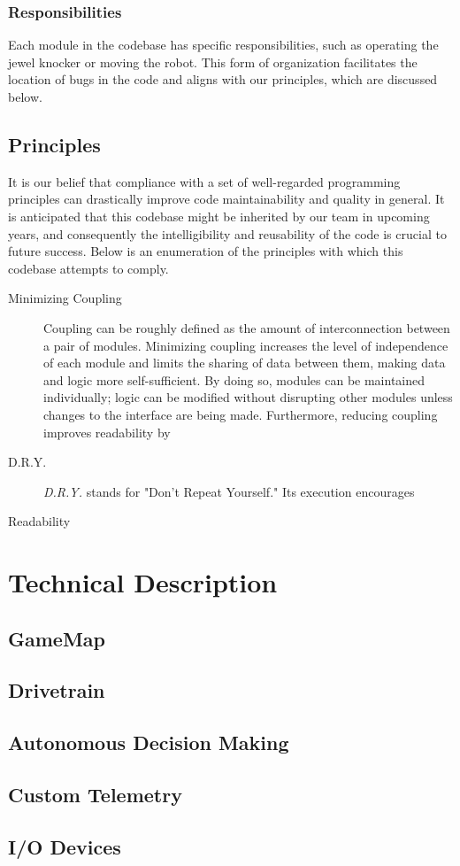 \documentclass{article}
\begin{document}
\subsubsection{Responsibilities}

Each module in the codebase has specific responsibilities, such as operating the jewel knocker or moving the robot. This form of organization facilitates the location of bugs in the code and aligns with our principles, which are discussed below.

\subsection{Principles}

It is our belief that compliance with a set of well-regarded programming principles can drastically improve code maintainability and quality in general. It is anticipated that this codebase might be inherited by our team in upcoming years, and consequently the intelligibility and reusability of the code is crucial to future success. Below is an enumeration of the principles with which this codebase attempts to comply.
\begin{description}

\item[Minimizing Coupling]
Coupling can be roughly defined as the amount of interconnection between a pair of modules. Minimizing coupling increases the level of independence of each module and limits the sharing of data between them, making data and logic more self-sufficient. By doing so, modules can be maintained individually; logic can be modified without disrupting other modules unless changes to the interface are being made. Furthermore, reducing coupling improves readability by

\item[D.R.Y.]
\textit{D.R.Y.} stands for "Don't Repeat Yourself." Its execution encourages
\item[Readability]

\end{description}

\section{Technical Description}

\subsection{GameMap}

\subsection{Drivetrain}

\subsection{Autonomous Decision Making}

\subsection{Custom Telemetry}

\subsection{I/O Devices}
\end{document}
